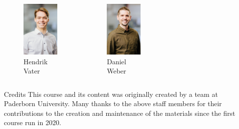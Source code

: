 \begin{frame}
\begin{columns}[t]
	\begin{figure}
		\centering
			\includegraphics[height=2.75cm]{fig/lec01/Vater.jpg}
			\caption*{Hendrik\\ Vater}
	\end{figure}

	\begin{figure}
		\centering
			\includegraphics[height=2.75cm]{fig/lec01/Weber.jpg}
			\caption*{Daniel\\ Weber}
	\end{figure}
\end{columns}
\vspace{-0.25cm}
	\begin{block}{Credits}
			This course and its content was originally created by a team at Paderborn University. Many thanks to the above staff members for their contributions to the creation and maintenance of the materials since the first course run in 2020.
	\end{block}

\end{frame}

